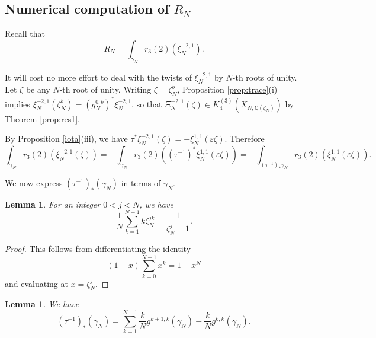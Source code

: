 \documentclass[11pt,a4,leqno]{amsart}
\theoremstyle{my theoremstyle}
\newtheorem{lem}[thm]{Lemma}
\theoremstyle{dfn}
\theoremstyle{remark}
\renewcommand{\1}{\mathbbm{1}}
\newcommand{\Q}{\mathbb{Q}}
\newcommand{\e}{\varepsilon}
\numberwithin{equation}{section}
\begin{document}
\subsection{Numerical computation of $R_N$} \label{subsec:regnum}

Recall that 
\begin{equation*}
    R_N = \int_{\gamma_N} r_3(2)(\xi_N^{-2,1}).
\end{equation*}

It will cost no more effort to deal with the twists of $\xi_N^{-2,1}$ by $N$-th roots of unity. Let $\zeta$ be any $N$-th root of unity. 
Writing $\zeta = \zeta_N^b$, Proposition \ref{prop:trace}(i) implies $\xi_N^{-2,1}(\zeta_N^b) = (g_N^{0,b})^* \xi_N^{-2,1}$, so that $\Xi_N^{-2,1}(\zeta) \in K_4^{(3)}(X_{N,\Q(\zeta_N)})$ by Theorem \ref{prop:res1}.

By Proposition \ref{iota}(iii), we have $\tau^* \xi^{-2, 1}_N(\zeta)=-\xi^{1, 1}_N(\e \zeta)$. Therefore
\begin{equation}\label{eq:num}
    \int_{\gamma_N} r_3(2)(\xi^{-2,1}_N(\zeta)) = - \int_{\gamma_N} r_3(2)((\tau^{-1})^* \xi^{1,1}_N(\e \zeta)) = - \int_{(\tau^{-1})_* \gamma_N} r_3(2)(\xi^{1,1}_N(\e \zeta)).
\end{equation}

We now express $(\tau^{-1})_*(\gamma_N)$ in terms of $\gamma_N$.

\begin{lem} \label{lem:sumroots}
For an integer $0<j<N$, we have
\begin{equation*}
    \frac{1}{N} \sum_{k=1}^{N-1} k \zeta_N^{jk} = \frac{1}{\zeta_N^j-1}.
\end{equation*}
\end{lem}

\begin{proof}
    This follows from differentiating the identity
    \begin{equation*}
        (1-x) \sum_{k=0}^{N-1} x^k = 1-x^N
    \end{equation*}
    and evaluating at $x = \zeta_N^j$.
\end{proof}

\begin{lem} \label{lem:tau gamma}
We have
\begin{equation*}
    (\tau^{-1})_*(\gamma_N) = \sum_{k=1}^{N-1} \frac{k}{N} g^{k+1,k}(\gamma_N) - \frac{k}{N} g^{k,k}(\gamma_N).
\end{equation*}
\end{lem}
\end{document}
